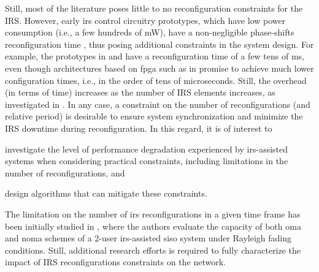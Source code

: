 Still, most of the literature poses little to no reconfiguration constraints for the IRS.
However, early \gls{irs} control circuitry prototypes, which have low power consumption (i.e., a few hundreds of mW), have a non-negligible phase-shifts reconfiguration time \cite{mu2021capacity, ETSIGRRIS003}, thus posing additional constraints in the system design. For example, the prototypes in \cite{rossanese2022designing} and \cite{alexandropoulos2023ris} have a reconfiguration time of a few tens of ms, even though architectures based on \gls{fpga} such as in \cite{yezhen2020novel} promise to achieve much lower configuration times, i.e., in the order of tens of microseconds.
Still, the overhead (in terms of time)  increases as the number of IRS elements increases, as investigated in \cite{jamali2022low, nadeem2020asymptotic, Qian22joint}. 
In any case, a constraint on the number of reconfigurations (and relative period) is desirable to ensure system synchronization and minimize the IRS downtime during reconfiguration. In this regard, it is of interest to 
\begin{enumerate*}[label=(\textit{\roman*})]
  \item investigate the level of performance degradation experienced by \gls{irs}-assisted systems when considering practical constraints, including limitations in the number of reconfigurations, and
  \item design algorithms that can mitigate these constraints. 
\end{enumerate*}
The limitation on the number of \gls{irs} reconfigurations in a given time frame has been initially studied in \cite{mu2021capacity}, where the authors evaluate the capacity of both \gls{oma} and \gls{noma} schemes of a 2-user \gls{irs}-assisted \gls{siso} system under Rayleigh fading conditions. Still, additional research efforts is required to fully characterize the impact of IRS reconfigurations constraints on the network.

